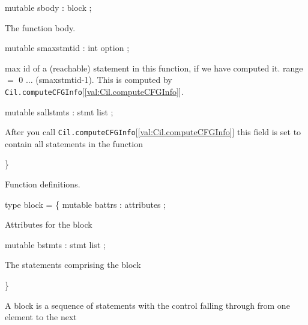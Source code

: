 \documentclass[11pt]{article}
\begin{document}
\begin{ocamldoccode}
  mutable sbody : block ;
\end{ocamldoccode}
\begin{ocamldoccomment}
The function body.
\end{ocamldoccomment}
\begin{ocamldoccode}
  mutable smaxstmtid : int option ;
\end{ocamldoccode}
\begin{ocamldoccomment}
max id of a (reachable) statement 
 in this function, if we have 
 computed it. range $=$ 0 $\ldots$ 
 (smaxstmtid-1). This is computed by 
 {\tt{Cil.computeCFGInfo}}[\ref{val:Cil.computeCFGInfo}].
\end{ocamldoccomment}
\begin{ocamldoccode}
  mutable sallstmts : stmt list ;
\end{ocamldoccode}
\begin{ocamldoccomment}
After you call {\tt{Cil.computeCFGInfo}}[\ref{val:Cil.computeCFGInfo}] 
 this field is set to contain all 
 statements in the function
\end{ocamldoccomment}
\begin{ocamldoccode}
\}
\end{ocamldoccode}
\begin{ocamldocdescription}
Function definitions.


\end{ocamldocdescription}




\label{type:Cil.block}\begin{ocamldoccode}
type block = \{
  mutable battrs : attributes ;
\end{ocamldoccode}
\begin{ocamldoccomment}
Attributes for the block
\end{ocamldoccomment}
\begin{ocamldoccode}
  mutable bstmts : stmt list ;
\end{ocamldoccode}
\begin{ocamldoccomment}
The statements comprising the block
\end{ocamldoccomment}
\begin{ocamldoccode}
\}
\end{ocamldoccode}
\begin{ocamldocdescription}
A block is a sequence of statements with the control falling through from 
    one element to the next


\end{ocamldocdescription}
\end{document}
